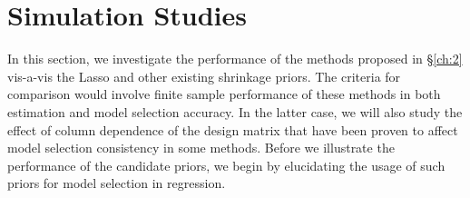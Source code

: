 \documentclass[ba]{imsart}
\def\sql{$\sqrt{\text{Lasso}}$}
\begin{document}
%
%


\section{Simulation Studies}\label{sec:sim}

In this section, we investigate the performance of the methods proposed in \S \ref{ch:2} vis-a-vis the Lasso and other existing shrinkage priors. The criteria for comparison would involve finite sample performance of these methods in both estimation and model selection accuracy. 
In the latter case, we will also study the effect of column dependence of the design matrix that have been proven to affect model selection consistency in some methods. Before we illustrate the performance of the candidate priors, we begin by elucidating the usage of such priors for model selection in regression. 
\end{document}
